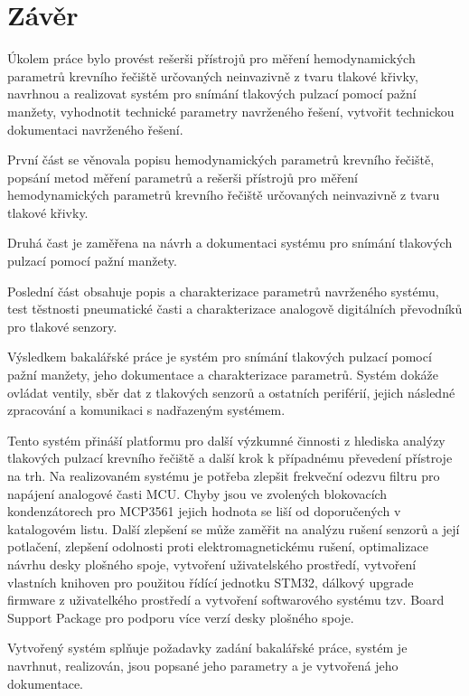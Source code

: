 \documentclass{ctuthesis}
\begin{document}
\chapter{Závěr}
Úkolem práce bylo provést rešerši přístrojů pro měření hemodynamických parametrů krevního řečiště určovaných neinvazivně z tvaru
tlakové křivky, navrhnou a realizovat systém pro snímání tlakových pulzací pomocí pažní manžety, vyhodnotit technické parametry navrženého řešení, vytvořit technickou dokumentaci navrženého řešení.
\par
První část se věnovala popisu hemodynamických parametrů krevního řečiště, popsání metod měření parametrů a rešerši přístrojů pro měření hemodynamických parametrů krevního řečiště určovaných neinvazivně z tvaru
tlakové křivky.
\par
Druhá čast je zaměřena na návrh a dokumentaci systému pro snímání tlakových pulzací pomocí pažní manžety.
\par
Poslední část obsahuje popis a charakterizace parametrů navrženého systému, test těstnosti pneumatické časti a charakterizace analogově digitálních převodníků pro tlakové senzory.
\par
Výsledkem bakalářské práce je systém pro snímání tlakových pulzací pomocí pažní manžety, jeho dokumentace a charakterizace parametrů. Systém dokáže ovládat ventily, sběr dat z tlakových senzorů a ostatních periférií, jejich následné zpracování a komunikaci s nadřazeným systémem.
\par
Tento systém přináší platformu pro další výzkumné činnosti z hlediska analýzy tlakových pulzací krevního řečiště a další krok k případnému převedení přístroje na trh. Na realizovaném systému je potřeba zlepšit frekveční odezvu filtru pro napájení analogové časti MCU. Chyby jsou ve zvolených blokovacích kondenzátorech
pro MCP3561 jejich hodnota se liší od doporučených v katalogovém listu. Další zlepšení se může zaměřit na analýzu rušení senzorů a její potlačení, zlepšení odolnosti proti elektromagnetickému rušení, optimalizace návrhu desky plošného spoje, vytvoření uživatelského prostředí, vytvoření vlastních knihoven pro použitou
řídící jednotku STM32, dálkový upgrade firmware z uživatelkého prostředí a vytvoření softwarového systému tzv. Board Support Package pro podporu více verzí desky plošného spoje.
\par
Vytvořený systém splňuje požadavky zadání bakalářské práce, systém je navrhnut, realizován, jsou popsané jeho parametry a je vytvořená jeho dokumentace.


\appendix
\end{document}
